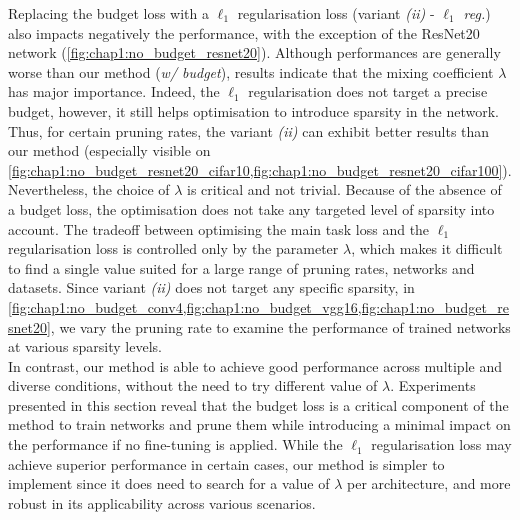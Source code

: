 Replacing the budget loss with a $\ell_1$ regularisation loss (variant
\emph{(ii)} - \emph{$\ell_1$ reg.}) also impacts negatively the performance,
with the exception of the ResNet20 network
(\cref{fig:chap1:no_budget_resnet20}). Although performances are generally worse
than our method (\emph{w/ budget}), results indicate that the mixing coefficient
$\lambda$ has major importance. Indeed, the $\ell_1$ regularisation does not
target a precise budget, however, it still helps optimisation to introduce
sparsity in the network. Thus, for certain pruning rates, the variant
\emph{(ii)} can exhibit better results than our method (especially visible on
\cref{fig:chap1:no_budget_resnet20_cifar10,fig:chap1:no_budget_resnet20_cifar100}).
Nevertheless, the choice of $\lambda$ is critical and not trivial. Because of
the absence of a budget loss, the optimisation does not take any targeted level
of sparsity into account. The tradeoff between optimising the main task loss and
the $\ell_1$ regularisation loss is controlled only by the parameter $\lambda$,
which makes it difficult to find a single value suited for a large range of
pruning rates, networks and datasets. Since variant \emph{(ii)} does not target
any specific sparsity, in
\cref{fig:chap1:no_budget_conv4,fig:chap1:no_budget_vgg16,fig:chap1:no_budget_resnet20},
we vary the pruning rate to examine the performance of trained networks at
various sparsity levels.\\

In contrast, our method is able to achieve good performance across multiple and
diverse conditions, without the need to try different value of $\lambda$.
Experiments presented in this section reveal that the budget loss is a critical
component of the method to train networks and prune them while introducing a
minimal impact on the performance if no fine-tuning is applied. While the
$\ell_1$ regularisation loss may achieve superior performance in certain cases,
our method is simpler to implement since it does need to search for a value of
$\lambda$ per architecture, and more robust in its applicability across various
scenarios.\\

